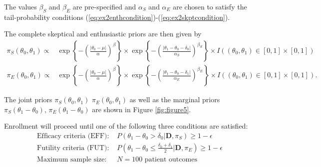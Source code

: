 \documentclass[12pt]{article}
\begin{document}
The values $\beta_S$ and $\beta_E$ are pre-specified and $\alpha_S$ and $\alpha_E$ are chosen to satisfy the tail-probability conditions 
(\ref{eq:ex2enthcondition})-(\ref{eq:ex2skptcondition}).

The complete skeptical and enthusiastic priors are then given by 
\begin{align}
\pi_S(\theta_0,\theta_1)\propto&\exp\left\{-\left(\frac{|\theta_0-\mu|}{\alpha}\right)^{\beta}\right\}\times \exp\left\{-\left(\frac{|\theta_1-\theta_0-\delta_0|}{\alpha_S}\right)^{\beta_S}\right\}\times I((\theta_0,\theta_1)\in [0,1]\times[0,1])\label{eq:ex2skpt}\\
\pi_E(\theta_0,\theta_1)\propto&\exp\left\{-\left(\frac{|\theta_0-\mu|}{\alpha}\right)^{\beta}\right\}\times \exp\left\{-\left(\frac{|\theta_1-\theta_0-\delta_1|}{\alpha_E}\right)^{\beta_E}\right\}\times I((\theta_0,\theta_1)\in [0,1]\times[0,1])\label{eq:ex2enth}.
\end{align}

The joint priors $\pi_S(\theta_0,\theta_1)$ $\pi_E(\theta_0,\theta_1)$ as well as the marginal priors $\pi_S(\theta_1-\theta_0)$, $\pi_E(\theta_1-\theta_0)$ are shown in Figure \ref{fig:figure5}.
%



%				

Enrollment will proceed until one of the following three conditions are satisfied:
\begin{align}
\text{Efficacy criteria (EFF): }&P(\theta_1-\theta_0>\delta_0|\mathbf{D},\pi_S)\geq 1-\epsilon \label{eq:ex2efficacy}\\
\text{Futility criteria (FUT): }&P\left(\theta_1-\theta_0 \leq \frac{\delta_0+\delta_1}{2}\Big|\mathbf{D},\pi_E\right)\geq 1-\epsilon
\label{eq:ex2futility}\\
\text{Maximum sample size: }&N=100 \text{ patient outcomes}\label{eq:ex2maxss}
\end{align}
\end{document}
